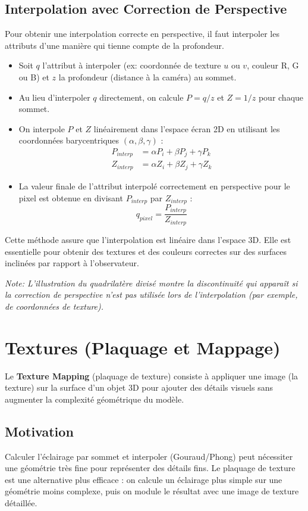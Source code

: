 \documentclass{article}
\begin{document}
\subsection{Interpolation avec Correction de Perspective}
Pour obtenir une interpolation correcte en perspective, il faut interpoler les attributs d'une manière qui tienne compte de la profondeur.
\begin{itemize}
    \item Soit $q$ l'attribut à interpoler (ex: coordonnée de texture $u$ ou $v$, couleur R, G ou B) et $z$ la profondeur (distance à la caméra) au sommet.
    \item Au lieu d'interpoler $q$ directement, on calcule $P = q/z$ et $Z = 1/z$ pour chaque sommet.
    \item On interpole $P$ et $Z$ linéairement dans l'espace écran 2D en utilisant les coordonnées barycentriques $(\alpha, \beta, \gamma)$ :
      \begin{align*} P_{interp} &= \alpha P_i + \beta P_j + \gamma P_k \\ Z_{interp} &= \alpha Z_i + \beta Z_j + \gamma Z_k \end{align*}
    \item La valeur finale de l'attribut interpolé correctement en perspective pour le pixel est obtenue en divisant $P_{interp}$ par $Z_{interp}$ :
      \[ q_{pixel} = \frac{P_{interp}}{Z_{interp}} \]
\end{itemize}
Cette méthode assure que l'interpolation est linéaire dans l'espace 3D. Elle est essentielle pour obtenir des textures et des couleurs correctes sur des surfaces inclinées par rapport à l'observateur.

\textit{Note: L'illustration du quadrilatère divisé montre la discontinuité qui apparaît si la correction de perspective n'est pas utilisée lors de l'interpolation (par exemple, de coordonnées de texture).}

\section{Textures (Plaquage et Mappage)}

Le \textbf{Texture Mapping} (plaquage de texture) consiste à appliquer une image (la texture) sur la surface d'un objet 3D pour ajouter des détails visuels sans augmenter la complexité géométrique du modèle.

\subsection{Motivation}
Calculer l'éclairage par sommet et interpoler (Gouraud/Phong) peut nécessiter une géométrie très fine pour représenter des détails fins. Le plaquage de texture est une alternative plus efficace : on calcule un éclairage plus simple sur une géométrie moins complexe, puis on module le résultat avec une image de texture détaillée.
\end{document}
